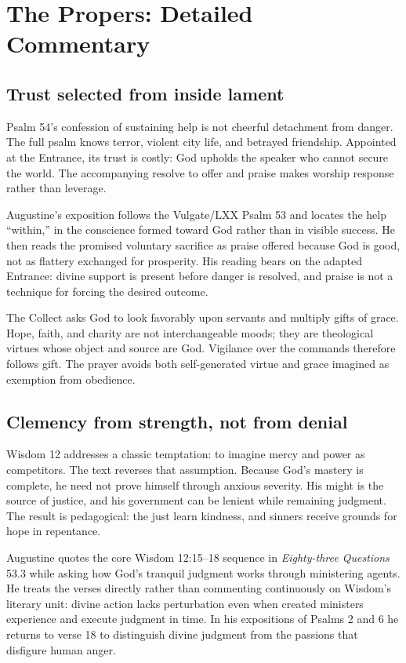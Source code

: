 \section*{The Propers: Detailed Commentary}

\subsection*{Trust selected from inside lament\enspace{}}

Psalm 54's confession of sustaining help is not cheerful detachment from danger. The full psalm knows terror, violent city life, and betrayed friendship. Appointed at the Entrance, its trust is costly: God upholds the speaker who cannot secure the world. The accompanying resolve to offer and praise makes worship response rather than leverage.

Augustine's exposition follows the Vulgate/LXX Psalm 53 and locates the help “within,” in the conscience formed toward God rather than in visible success. He then reads the promised voluntary sacrifice as praise offered because God is good, not as flattery exchanged for prosperity. His reading bears on the adapted Entrance: divine support is present before danger is resolved, and praise is not a technique for forcing the desired outcome.

The Collect asks God to look favorably upon servants and multiply gifts of grace. Hope, faith, and charity are not interchangeable moods; they are theological virtues whose object and source are God. Vigilance over the commands therefore follows gift. The prayer avoids both self-generated virtue and grace imagined as exemption from obedience.

\subsection*{Clemency from strength, not from denial\enspace{}}

Wisdom 12 addresses a classic temptation: to imagine mercy and power as competitors. The text reverses that assumption. Because God's mastery is complete, he need not prove himself through anxious severity. His might is the source of justice, and his government can be lenient while remaining judgment. The result is pedagogical: the just learn kindness, and sinners receive grounds for hope in repentance.

Augustine quotes the core Wisdom 12:15--18 sequence in \emph{Eighty-three Questions} 53.3 while asking how God's tranquil judgment works through ministering agents. He treats the verses directly rather than commenting continuously on Wisdom's literary unit: divine action lacks perturbation even when created ministers experience and execute judgment in time. In his expositions of Psalms 2 and 6 he returns to verse 18 to distinguish divine judgment from the passions that disfigure human anger.

